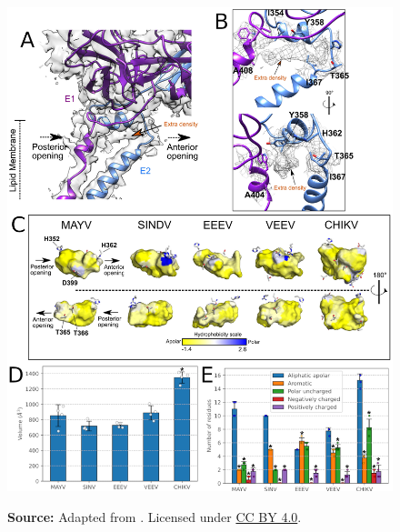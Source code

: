 \documentclass[Ingles]{phdthesis}
\begin{document}
\begin{figure}
  \centerline{\includegraphics[scale=0.22]{images/mayv-e1-e2.png}}
  \centerline{\tiny{\textbf{Source:} Adapted from \cite{ribeiro2021}. Licensed under \href{https://creativecommons.org/licenses/by/4.0/}{CC BY 4.0}.}}

\end{figure}
\end{document}
